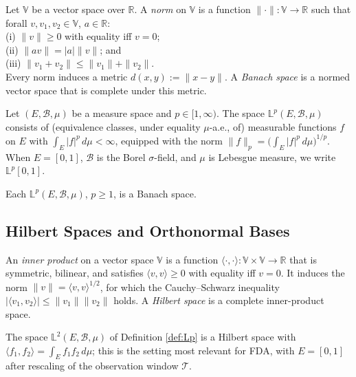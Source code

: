 \begin{definition}
Let $\mathbb{V}$ be a vector space over $\mathbb{R}$. A \emph{norm} on $\mathbb{V}$ is a function $\|\cdot\|:\mathbb{V}\to\mathbb{R}$ such that forall $v,v_1,v_2\in\mathbb{V}$, $a\in\mathbb{R}$:\\ 
(i) $\|v\|\geq 0$ with equality iff $v=0$;\\ 
(ii) $\|av\| = |a|\|v\|$; and\\ 
(iii) $\|v_1+v_2\|\leq\|v_1\|+\|v_2\|$. \\
Every norm induces a metric $d(x,y):=\|x-y\|$. A \emph{Banach space} is a normed vector space that is
complete under this metric.
\end{definition}

\begin{definition}
\label{def:Lp}
Let $(E,\mathcal{B},\mu)$ be a measure space and $p\in[1,\infty)$. The space
$\mathbb{L}^p(E,\mathcal{B},\mu)$ consists of (equivalence classes, under
equality $\mu$-a.e., of) measurable functions $f$ on $E$ with $\int_E
|f|^p\,d\mu<\infty$, equipped with the norm $\|f\|_p =
\big(\int_E|f|^p\,d\mu\big)^{1/p}$. When $E=[0,1]$, $\mathcal{B}$ is the
Borel $\sigma$-field, and $\mu$ is Lebesgue measure, we write
$\mathbb{L}^p[0,1]$. 
\end{definition}

\begin{theorem}
    Each $\mathbb{L}^p(E,\mathcal{B},\mu)$, $p\geq 1$, is a Banach space.
\end{theorem}

\subsection{Hilbert Spaces and Orthonormal Bases}

\begin{definition}
An \emph{inner product} on a vector space $\mathbb{V}$ is a function
$\langle\cdot,\cdot\rangle:\mathbb{V}\times\mathbb{V}\to\mathbb{R}$ that is
symmetric, bilinear, and satisfies $\langle v,v\rangle\geq 0$ with equality
iff $v=0$. It induces the norm $\|v\| = \langle v,v\rangle^{1/2}$, for which
the Cauchy--Schwarz inequality $|\langle v_1,v_2\rangle|\leq
\|v_1\|\|v_2\|$ holds. A \emph{Hilbert space} is a complete inner-product
space. 
\end{definition}
The space $\mathbb{L}^2(E,\mathcal{B},\mu)$ of Definition
\ref{def:Lp} is a Hilbert space with $\langle f_1,f_2\rangle =
\int_E f_1f_2\,d\mu$; this is the setting most relevant for FDA, with $E =[0,1]$ after rescaling of the observation window $\mathcal{T}$.

